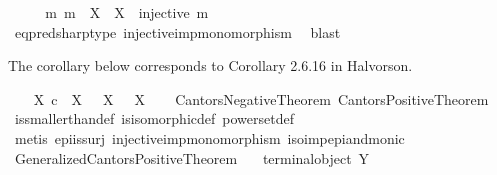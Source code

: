 \begin{isabellebody}
\isanewline
\ \ \isamarkupfalse%
\ \isamarkupfalse%
\ {\isachardoublequoteopen}{\isasymexists}m{\isachardot}{\kern0pt}\ m\ {\isacharcolon}{\kern0pt}\ X\ {\isasymrightarrow}\ {\isasymOmega}\isactrlbsup X\isactrlesup \ {\isasymand}\ injective\ m{\isachardoublequoteclose}\isanewline
\ \ \ \ \isamarkupfalse%
\ eq{\isacharunderscore}{\kern0pt}pred{\isacharunderscore}{\kern0pt}sharp{\isacharunderscore}{\kern0pt}type\ injective{\isacharunderscore}{\kern0pt}imp{\isacharunderscore}{\kern0pt}monomorphism\ \isamarkupfalse%
\ blast\isanewline
{}\isamarkupfalse%
%
\endisatagproof
{\isafoldproof}%
%
\isadelimproof
%
\endisadelimproof
%
\begin{isamarkuptext}%
The corollary below corresponds to Corollary 2.6.16 in Halvorson.%
\end{isamarkuptext}\isamarkuptrue%
\isamarkupfalse%
\ \isanewline
\ \ {\isachardoublequoteopen}X\ {\isasymle}\isactrlsub c\ {\isasymP}\ X\ {\isasymand}\ {\isasymnot}\ {\isacharparenleft}{\kern0pt}X\ {\isasymcong}\ {\isasymP}\ X{\isacharparenright}{\kern0pt}{\isachardoublequoteclose}\isanewline
%
\isadelimproof
\ \ %
\endisadelimproof
%
\isatagproof
{}\isamarkupfalse%
\ Cantors{\isacharunderscore}{\kern0pt}Negative{\isacharunderscore}{\kern0pt}Theorem\ Cantors{\isacharunderscore}{\kern0pt}Positive{\isacharunderscore}{\kern0pt}Theorem\isanewline
\ \ \isamarkupfalse%
\ is{\isacharunderscore}{\kern0pt}smaller{\isacharunderscore}{\kern0pt}than{\isacharunderscore}{\kern0pt}def\ is{\isacharunderscore}{\kern0pt}isomorphic{\isacharunderscore}{\kern0pt}def\ powerset{\isacharunderscore}{\kern0pt}def\isanewline
\ \ \isamarkupfalse%
\ {\isacharparenleft}{\kern0pt}metis\ epi{\isacharunderscore}{\kern0pt}is{\isacharunderscore}{\kern0pt}surj\ injective{\isacharunderscore}{\kern0pt}imp{\isacharunderscore}{\kern0pt}monomorphism\ iso{\isacharunderscore}{\kern0pt}imp{\isacharunderscore}{\kern0pt}epi{\isacharunderscore}{\kern0pt}and{\isacharunderscore}{\kern0pt}monic{\isacharparenright}{\kern0pt}%
\endisatagproof
{\isafoldproof}%
%
\isadelimproof
\isanewline
%
\endisadelimproof
\isanewline
{}\isamarkupfalse%
\ Generalized{\isacharunderscore}{\kern0pt}Cantors{\isacharunderscore}{\kern0pt}Positive{\isacharunderscore}{\kern0pt}Theorem{\isacharcolon}{\kern0pt}\isanewline
\ \ \ {\isachardoublequoteopen}{\isasymnot}{\isacharparenleft}{\kern0pt}terminal{\isacharunderscore}{\kern0pt}object\ Y{\isacharparenright}{\kern0pt}{\isachardoublequoteclose}\isanewline

\end{isabellebody}
